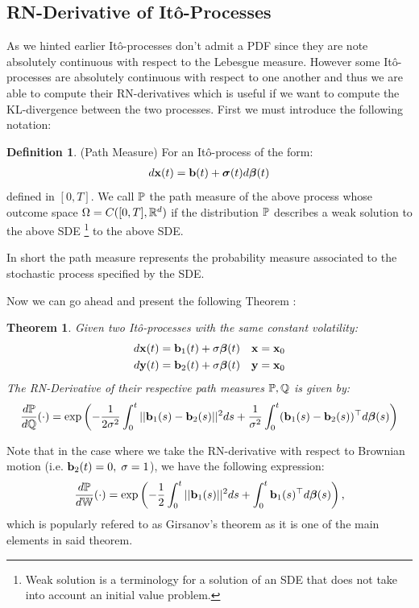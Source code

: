 \documentclass[a4paper,12pt,twoside,openright]{report}
\newtheorem{theorem}{Theorem}
\theoremstyle{definition}
\newtheorem{definition}{Definition}[section]
\begin{document}
\subsection{RN-Derivative of Itô-Processes}


As we hinted earlier Itô-processes don't admit a PDF since they are note absolutely continuous with respect to the Lebesgue measure. However some Itô-processes are absolutely continuous with respect to one another and thus we are able to compute their RN-derivatives which is useful if we want to compute the KL-divergence between the two processes.  First we must introduce the following notation:
\begin{definition} (Path Measure)
    For an Itô-process of the form:
    \begin{align*}
        d\rvx(t) = \rvb(t) + \rvsigma(t) d\rvw(t)
    \end{align*}
    defined in $[0,T]$. We call $\P$ the path measure of the above process whose outcome space $\Omega=C([0,T], \R^d)$ if the distribution $\P$ describes a weak solution to the above SDE \footnote{Weak solution is a terminology for a solution of an SDE that does not take into account an initial value problem.} to the above SDE.
\end{definition}

In short the path measure represents the probability measure associated to the stochastic process specified by the SDE. 

Now we can go ahead and present the following Theorem \citep{sarkka2019applied}:
\begin{theorem}\label{thrm:ito_ratio}\citep{sarkka2019applied}
Given two Itô-processes with the same constant volatility: 
    \begin{align*}
        d\rvx(t) = \rvb_1(t) + \sigma \rvw(t) \quad \rvx = \rvx_0\\
        d\rvy(t) = \rvb_2(t) + \sigma\rvw(t) \quad \rvy = \rvx_0
    \end{align*}
The RN-Derivative of their respective path measures $\P,\Q$ is given by:
\begin{align} \label{eq:girsanov}
    \frac{d\P}{d\Q}(\cdot) = \exp\left(-\frac{1}{2\sigma^2}\int_0^t ||\rvb_1(s) - \rvb_2(s)||^2 ds + \frac{1}{\sigma^2}\int_0^t (\rvb_1(s) - \rvb_2(s))^{\top}d\rvw(s) \right)
\end{align}
\end{theorem}
Note that in the case where we take the RN-derivative with respect to Brownian motion (i.e. $\rvb_2(t) =0, \; \sigma=1$), we have the following expression:
\begin{align} \label{eq:girsanov_0}
    \frac{d\P}{d\W}(\cdot) = \exp\left(-\frac{1}{2}\int_0^t ||\rvb_1(s) ||^2 ds + \int_0^t \rvb_1(s)^{\top}d\rvw(s) \right),
\end{align}
which is popularly refered to as Girsanov's theorem as it is one of the main elements in said theorem.
\end{document}
